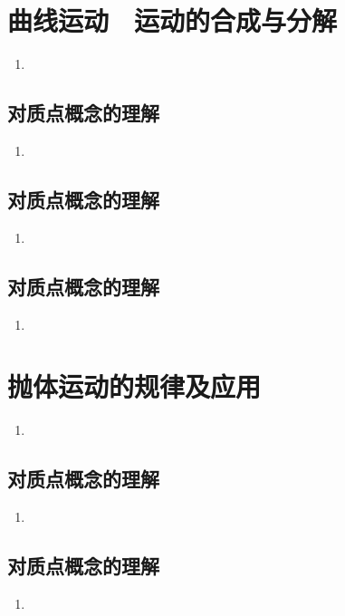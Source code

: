 \documentclass[cn,11pt]{elegantbook}
\begin{document}
\chapter{曲线运动　运动的合成与分解}
\begin{enumerate}
   \item 
\end{enumerate}

\section{对质点概念的理解}
\begin{enumerate}
   \item 
\end{enumerate}

\section{对质点概念的理解}
\begin{enumerate}
   \item 
\end{enumerate}

\section{对质点概念的理解}
\begin{enumerate}
   \item 
\end{enumerate}


\chapter{抛体运动的规律及应用}
\begin{enumerate}
   \item 
\end{enumerate}

\section{对质点概念的理解}
\begin{enumerate}
   \item 
\end{enumerate}

\section{对质点概念的理解}
\begin{enumerate}
   \item 
\end{enumerate}
\end{document}
